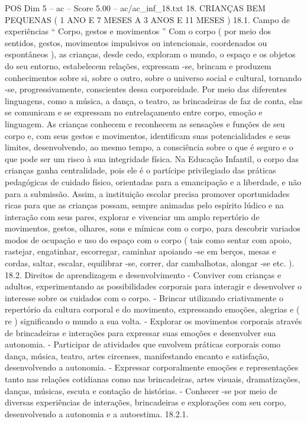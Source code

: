 \begin{textsample}{POS Dim 5 – ac – Score 5.00 – ac/ac\_inf\_18.txt}  \label{ex:f5_pos_129}
18.
CRIANÇAS BEM PEQUENAS ( 1 ANO E 7 MESES A 3 ANOS E 11 MESES ) 18.1.
Campo de experiências “ Corpo, gestos e movimentos ” Com o corpo ( por meio dos sentidos, gestos, movimentos impulsivos ou intencionais, coordenados ou espontâneos ), as crianças, desde cedo, exploram o mundo, o espaço e os objetos do seu entorno, estabelecem relações, expressam -se, brincam e produzem conhecimentos sobre si, sobre o outro, sobre o universo social e cultural, tornando -se, progressivamente, conscientes dessa corporeidade.
Por meio das diferentes linguagens, como a música, a dança, o teatro, as brincadeiras de faz de conta, elas se comunicam e se expressam no entrelaçamento entre corpo, emoção e linguagem.
As crianças conhecem e reconhecem as sensações e funções de seu corpo e, com seus gestos e movimentos, identificam suas potencialidades e seus limites, desenvolvendo, ao mesmo tempo, a consciência sobre o que é seguro e o que pode ser um risco à sua integridade física.
Na Educação Infantil, o corpo das crianças ganha centralidade, pois ele é o partícipe privilegiado das práticas pedagógicas de cuidado físico, orientadas para a emancipação e a liberdade, e não para a submissão.
Assim, a instituição escolar precisa promover oportunidades ricas para que as crianças possam, sempre animadas pelo espírito lúdico e na interação com seus pares, explorar e vivenciar um amplo repertório de movimentos, gestos, olhares, sons e mímicas com o corpo, para descobrir variados modos de ocupação e uso do espaço com o corpo ( tais como sentar com apoio, rastejar, engatinhar, escorregar, caminhar apoiando -se em berços, mesas e cordas, saltar, escalar, equilibrar -se, correr, dar cambalhotas, alongar -se etc. ). 18.2.
Direitos de aprendizagem e desenvolvimento - Conviver com crianças e adultos, experimentando as possibilidades corporais para interagir e desenvolver o interesse sobre os cuidados com o corpo. - Brincar utilizando criativamente o repertório da cultura corporal e do movimento, expressando emoções, alegrias e ( re ) significando o mundo a sua volta. - Explorar os movimentos corporais através de brincadeiras e interações para expressar suas emoções e desenvolver sua autonomia. - Participar de atividades que envolvem práticas corporais como dança, música, teatro, artes circenses, manifestando encanto e satisfação, desenvolvendo a autonomia. - Expressar corporalmente emoções e representações tanto nas relações cotidianas como nas brincadeiras, artes visuais, dramatizações, danças, músicas, escuta e contação de histórias. - Conhecer -se por meio de diversas experiências de interações, brincadeiras e explorações com seu corpo, desenvolvendo a autonomia e a autoestima. 18.2.1.

\end{textsample}
